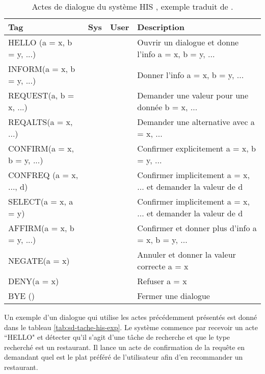 \documentclass{KodeBook}
\begin{document}
\begin{table}[ht]
	\centering\small
	\begin{tabular}{llll}
		\hline\hline
		Tag & Sys & User & Description \\
		\hline
		HELLO (a = x, b = y, ...) & \CheckedBox & \CheckedBox & Ouvrir un dialogue et donne l'info a = x, b = y, ... \\
		INFORM(a = x, b = y, ...) & \CheckedBox & \CheckedBox & Donner l'info a = x, b = y, ... \\
		REQUEST(a, b = x, ...) & \CheckedBox & \CheckedBox & Demander une valeur pour une donnée b = x, ... \\
		REQALTS(a = x, ...) & \XBox & \CheckedBox & Demander une alternative avec a = x, ... \\
		CONFIRM(a = x, b = y, ...) & \CheckedBox & \CheckedBox & Confirmer explicitement a = x, b = y, ... \\
		CONFREQ (a = x, ..., d) & \CheckedBox & \XBox & Confirmer implicitement a = x, ... et demander la valeur de d \\
		SELECT(a = x, a = y) & \CheckedBox & \XBox & Confirmer implicitement a = x, ... et demander la valeur de d \\
		AFFIRM(a = x, b = y, ...) & \CheckedBox & \CheckedBox & Confirmer et donner plus d'info a = x, b = y, ... \\
		NEGATE(a = x) & \XBox & \CheckedBox & Annuler et donner la valeur correcte a = x \\
		DENY(a = x) & \XBox & \CheckedBox & Refuser a = x \\
		BYE () & \CheckedBox & \CheckedBox & Fermer une dialogue \\
		\hline\hline
	\end{tabular}
	\caption[Actes de dialogue du système HIS]{Actes de dialogue du système HIS \cite{2010-young-al}, exemple traduit de \cite{2020-jurafsky-martin}.}
	\label{tab:sd-tache-his-acts}
\end{table}

Un exemple d'un dialogue qui utilise les actes précédemment présentés est donné dans le tableau \ref{tab:sd-tache-his-exp}.
Le système commence par recevoir un acte ``HELLO" et détecter qu'il s'agit d'une tâche de recherche et que le type recherché est un restaurant. 
Il lance un acte de confirmation de la requête en demandant quel est le plat préféré de l'utilisateur afin d'en recommander un restaurant. 
\end{document}
